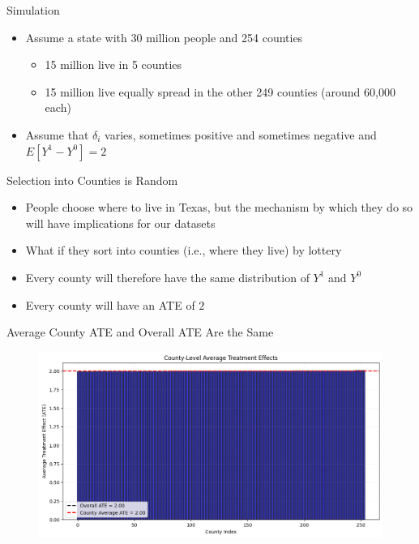 \documentclass{beamer}
\begin{document}
\begin{frame}{Simulation}

\begin{itemize}
\item Assume a state with 30 million people and 254 counties
	\begin{itemize}
	\item 15 million live in 5 counties
	\item 15 million live equally spread in the other 249 counties (around 60,000 each)
	\end{itemize}
\item Assume that $\delta_i$ varies, sometimes positive and sometimes negative and $E[Y^1 - Y^0] = 2$
\end{itemize}

\end{frame}

\begin{frame}{Selection into Counties is Random}

\begin{itemize}
\item People choose where to live in Texas, but the mechanism by which they do so will have implications for our datasets
\item What if they sort into counties (i.e., where they live) by lottery
\item Every county will therefore have the same distribution of $Y^1$ and $Y^0$
\item Every county will have an ATE of $2$
\end{itemize}

\end{frame}



\begin{frame}{Average County ATE and Overall ATE Are the Same }

\begin{figure}
    \centering
    \includegraphics[height=0.7\textheight]{./lecture_includes/tiebout_roy1}
\end{figure}

\end{frame}
\end{document}
